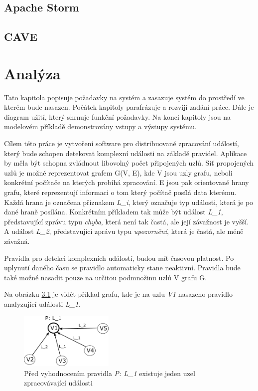 \documentclass[
  digital, %
  table,   %
  nolof,     %
  nolot,     %
  oneside, %
  nocover,
  monochrome,
  12pt
]{fithesis3}
\begin{document}
\section{Apache Storm}
\section{CAVE}
\chapter{Analýza}
\label{sec:analysis}

Tato kapitola popisuje požadavky na systém a zasazuje systém do prostředí ve kterém bude nasazen. Počátek kapitoly parafrázuje a rozvíjí zadání práce. Dále je diagram užití, který shrnuje funkční požadavky. Na konci kapitoly jsou na modelovém příkladě demonstrovány vstupy a výstupy systému.

Cílem této práce je vytvoření software pro distribuované zpracování událostí, který bude schopen detekovat komplexní události na základě pravidel. Aplikace by měla být schopna zvládnout libovolný počet připojených uzlů. Síť propojených uzlů je možné reprezentovat grafem G(V, E), kde V jsou uzly grafu, neboli konkrétní počítače na kterých probíhá zpracování. E jsou pak orientované hrany grafu, které reprezentují informaci o tom který počítač posílá data kterému. Každá hrana je označena příznakem \textit{L\_i}, který označuje typ události, která je po dané hraně posílána. Konkrétním příkladem tak může být událost \textit{L\_1}, představující zprávu typu \textit{chyba}, která není tak častá, ale její závažnost je vyšší. A událost \textit{L\_2}, představující zprávu typu \textit{upozornění}, která je častá, ale méně závažná.

Pravidla pro detekci komplexních událostí, budou mít časovou platnost. Po uplynutí daného času se pravidlo automaticky stane neaktivní. Pravidla bude také možné nasadit pouze na určitou podmnožinu uzlů V grafu G. 

Na obrázku \ref{fig:analysis_case_1} je vidět příklad grafu, kde je na uzlu \textit{V1} nasazeno pravidlo analyzující události \textit{L\_1}.

\begin{figure}[H]
	\centering
    \includegraphics[width=0.4\textwidth, height=0.15\textheight]{images/analysis_case_1.png}
    \caption{Před vyhodnocením pravidla \textit{P: L\_1} existuje jeden uzel zpracovávající události}
    \label{fig:analysis_case_1}
\end{figure}
\end{document}
